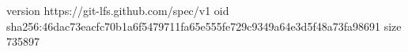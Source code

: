 version https://git-lfs.github.com/spec/v1
oid sha256:46dac73eacfc70b1a6f5479711fa65e555fe729c9349a64e3d5f48a73fa98691
size 735897
